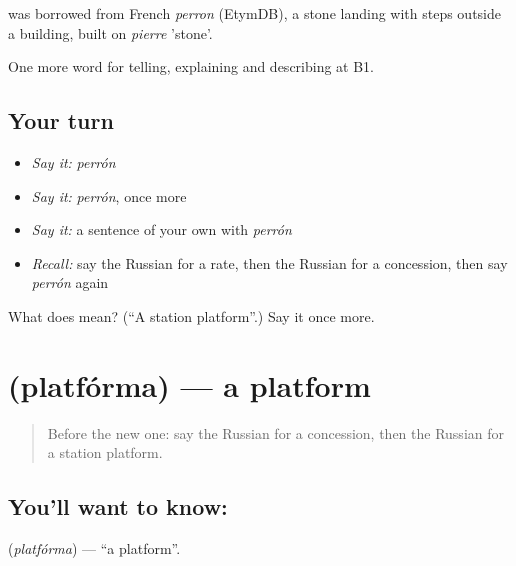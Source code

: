 \begin{cousinweb}
\emph{} was borrowed from French \emph{perron} (EtymDB), a stone landing with steps outside a building, built on \emph{pierre} 'stone'.
\end{cousinweb}

\begin{grammarlens}[title={What you've built}]
One more word for telling, explaining and describing at B1.
\end{grammarlens}

\subsection*{Your turn}
\begin{itemize}
\raggedright
  \item \emph{Say it:} \emph{perrón}
  \item \emph{Say it:} \emph{perrón}, once more
  \item \emph{Say it:} a sentence of your own with \emph{perrón}
  \item \emph{Recall:} say the Russian for a rate, then the Russian for a concession, then say \emph{perrón} again
\end{itemize}

\begin{tcolorbox}[breakable,colback=teal!4,colframe=teal!35!black,title={Before you move on}]
What does  mean? (\textquotedblleft{}A station platform\textquotedblright{}.) Say it once more.
\end{tcolorbox}
\section[\texorpdfstring{\ru{платформа} (platfórma)}{платформа (platfórma)}]{ (platfórma) — a platform}

\label{lesson:RU-C414-platforma}



\begin{quote}
Before the new one: say the Russian for a concession, then the Russian for a station platform.
\end{quote}

\subsection*{You'll want to know: }
\textbf{} (\emph{platfórma}) — \textquotedblleft{}a platform\textquotedblright{}.

